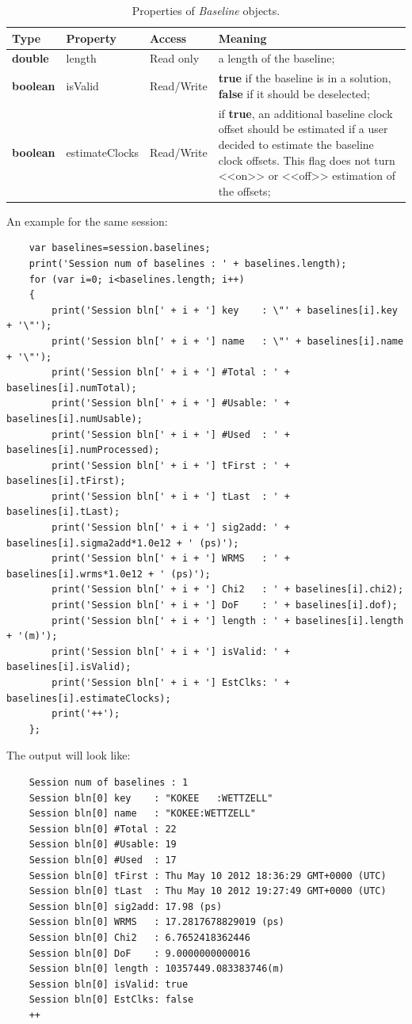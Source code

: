 \documentclass [10pt,letterpaper]{report}
\begin{document}
{\begin{table}[htb]
\centering
\footnotesize
\begin{tabular}{lllp{}}
\hline
Type & Property & Access & Meaning\\
\hline
  {\bf double}  & length          & Read only & a length of the baseline;\\
  {\bf boolean} & isValid         & Read/Write& {\bf true} if the baseline is in a solution, {\bf false} if it should be deselected;\\
  {\bf boolean} & estimateClocks  & Read/Write& if {\bf true}, an additional baseline clock offset should be estimated if a user decided
    to estimate the baseline clock offsets. This flag does not turn <<on>> or <<off>> estimation of the offsets;\\
\hline
\end{tabular}
\caption{Properties of {\sl Baseline} objects.}
\label{tab-scr-session-baseline}
\end{table}
\noindent
An example for the same session:
{\small\begin{verbatim}
    var baselines=session.baselines;
    print('Session num of baselines : ' + baselines.length);
    for (var i=0; i<baselines.length; i++)
    {
        print('Session bln[' + i + '] key    : \"' + baselines[i].key + '\"');
        print('Session bln[' + i + '] name   : \"' + baselines[i].name + '\"');
        print('Session bln[' + i + '] #Total : ' + baselines[i].numTotal);
        print('Session bln[' + i + '] #Usable: ' + baselines[i].numUsable);
        print('Session bln[' + i + '] #Used  : ' + baselines[i].numProcessed);
        print('Session bln[' + i + '] tFirst : ' + baselines[i].tFirst);
        print('Session bln[' + i + '] tLast  : ' + baselines[i].tLast);
        print('Session bln[' + i + '] sig2add: ' + baselines[i].sigma2add*1.0e12 + ' (ps)');
        print('Session bln[' + i + '] WRMS   : ' + baselines[i].wrms*1.0e12 + ' (ps)');
        print('Session bln[' + i + '] Chi2   : ' + baselines[i].chi2);
        print('Session bln[' + i + '] DoF    : ' + baselines[i].dof);
        print('Session bln[' + i + '] length : ' + baselines[i].length + '(m)');
        print('Session bln[' + i + '] isValid: ' + baselines[i].isValid);
        print('Session bln[' + i + '] EstClks: ' + baselines[i].estimateClocks);
        print('++');
    };
\end{verbatim}}
\noindent
The output will look like:
{\small\begin{verbatim}
    Session num of baselines : 1
    Session bln[0] key    : "KOKEE   :WETTZELL"
    Session bln[0] name   : "KOKEE:WETTZELL"
    Session bln[0] #Total : 22
    Session bln[0] #Usable: 19
    Session bln[0] #Used  : 17
    Session bln[0] tFirst : Thu May 10 2012 18:36:29 GMT+0000 (UTC)
    Session bln[0] tLast  : Thu May 10 2012 19:27:49 GMT+0000 (UTC)
    Session bln[0] sig2add: 17.98 (ps)
    Session bln[0] WRMS   : 17.2817678829019 (ps)
    Session bln[0] Chi2   : 6.7652418362446
    Session bln[0] DoF    : 9.0000000000016
    Session bln[0] length : 10357449.083383746(m)
    Session bln[0] isValid: true
    Session bln[0] EstClks: false
    ++
\end{verbatim}}
{\small%



}}
\end{document}
